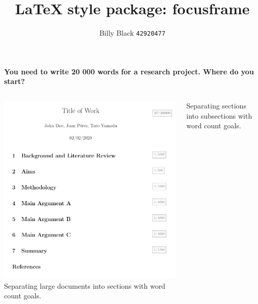 \documentclass[unknownkeysallowed,usepdftitle=false, parskip=full]{beamer}
\title{\LaTeX\,\,style package: focusframe}
\author{Billy Black \texttt{42920477}}
\newcommand{\secvariable}{nothing}
\newcommand{\mysection}[1]{\renewcommand{\secvariable}{#1}
}
\begin{document}
\mysection{abstract}
\begin{frame}\label{\secvariable}



\parbox{\linewidth}{

\vspace{5pt}
\textbf{You need to write 20 000 words for a research project. Where do you start?}



\vspace{12pt}
    \begin{columns}[t]
    \begin{column}[c]{0.45\textwidth}
        \includegraphics[scale=0.45]{figure/sectioning}
        \\
        \small Separating large documents into sections with word count goals.
    \end{column}
    \begin{column}[c]{0.45\textwidth}
    \parbox{\linewidth}{

    \small Separating sections into subsections with word count goals.
      
}
\end{column}
\end{columns}}
\end{frame}
\end{document}
